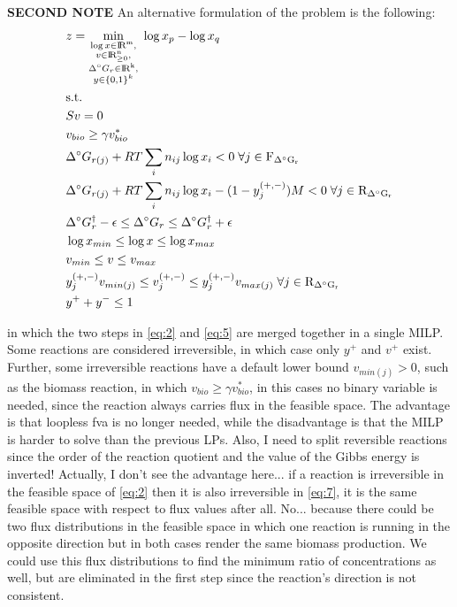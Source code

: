 \documentclass[12pt]{article}
\begin{document}
  \noindent \textbf{SECOND NOTE}
  An alternative formulation of the problem is the following:
  \begin{align}
    \begin{aligned}
      \label{eq:8}
      &z = \min_{\substack{ \log{x} \in \rm I\!R^m, \\
                            v \in \rm I\!R^n_{\geq 0}, \\
                            \Delta^{\circ} G_{r} \in \rm I\!R^k, \\
                            y \in \{0, 1\}^k }} \; \log{x_p} - \log{x_q}
      \\
      &\mathrm{s.t.}
      \\
      &Sv = 0
      \\
      &v_{bio} \geq \gamma v^*_{bio}
      \\
      &\Delta^{\circ} G_{r(j)} + RT \sum_i n_{ij} \log{x_i} < 0 \; \forall j \in \mathrm{F_{\Delta^{\circ} G_{r}}}
      \\
      &\Delta^{\circ} G_{r(j)} + RT \sum_i n_{ij} \log{x_i} - (1 - y_j^{(+, -)})M< 0 \; \forall j \in \mathrm{R_{\Delta^{\circ} G_{r}}}
      \\
      &\Delta^{\circ} G_{r}^{\dagger} - \epsilon \leq \Delta^{\circ} G_{r} \leq \Delta^{\circ} G_{r}^{\dagger} + \epsilon
      \\
      &\log{x}_{min} \leq \log{x} \leq \log{x}_{max}
      \\
      &v_{min} \leq v \leq v_{max}
      \\
      &y_j^{(+, -)} v_{min(j)} \leq v^{(+, -)}_j \leq y_j^{(+, -)} v_{max(j)} \; \forall j \in \mathrm{R_{\Delta^{\circ} G_{r}}}
      \\
      &y^+ + y^- \leq 1
    \end{aligned}
  \end{align}

  \noindent in which the two steps in \ref{eq:2} and \ref{eq:5} are merged together in a single MILP. Some reactions are considered irreversible, in which case only $y^+$ and $v^+$ exist. Further, some irreversible reactions have a default lower bound $v_{min(j)} > 0$, such as the biomass reaction, in which $v_{bio} \geq \gamma v^*_{bio}$, in this cases no binary variable is needed, since the reaction always carries flux in the feasible space. The advantage is that loopless fva is no longer needed, while the disadvantage is that the MILP is harder to solve than the previous LPs. Also, I need to split reversible reactions since the order of the reaction quotient and the value of the Gibbs energy is inverted! Actually, I don't see the advantage here... if a reaction is irreversible in the feasible space of \ref{eq:2} then it is also irreversible in \ref{eq:7}, it is the same feasible space with respect to flux values after all. No... because there could be two flux distributions in the feasible space in which one reaction is running in the opposite direction but in both cases render the same biomass production. We could use this flux distributions to find the minimum ratio of concentrations as well, but are eliminated in the first step since the reaction's direction is not consistent.





  
\end{document}
